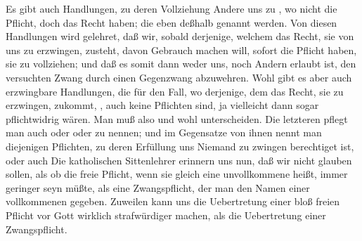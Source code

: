 \begin{aufza}
\item Es gibt auch Handlungen, zu deren Vollziehung Andere uns zu , wo nicht die Pflicht, doch das Recht haben; die eben deßhalb  genannt werden. Von diesen Handlungen wird gelehret, daß wir, sobald derjenige, welchem das Recht, sie von uns zu erzwingen, zusteht, davon Gebrauch machen will, sofort die Pflicht haben, sie zu vollziehen; und daß es somit dann weder uns, noch Andern erlaubt ist, den versuchten Zwang durch einen Gegenzwang abzuwehren. Wohl gibt es aber auch erzwingbare Handlungen, die für den Fall, wo derjenige, dem das Recht, sie zu erzwingen, zukommt, , auch keine Pflichten sind, ja vielleicht dann sogar pflichtwidrig wären. Man muß also  und  wohl unterscheiden. Die letzteren pflegt man auch  oder  oder  zu nennen; und im Gegensatze von ihnen nennt man diejenigen Pflichten, zu deren Erfüllung uns Niemand zu zwingen berechtiget ist,  oder auch  Die katholischen Sittenlehrer erinnern uns nun, daß wir nicht glauben sollen, als ob die freie Pflicht, wenn sie gleich eine unvollkommene heißt, immer geringer seyn müßte, als eine Zwangspflicht, der man den Namen einer vollkommenen gegeben. Zuweilen kann uns die Uebertretung einer bloß freien Pflicht vor Gott wirklich strafwürdiger machen, als die Uebertretung einer Zwangspflicht.
\end{aufza}

